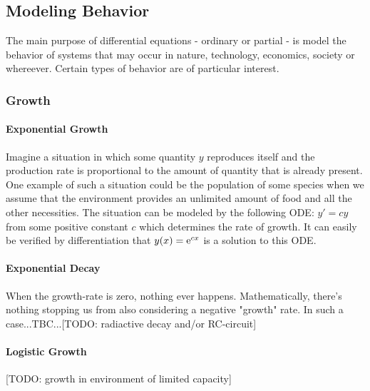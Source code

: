 \subsection{Modeling Behavior}
The main purpose of differential equations - ordinary or partial - is model the behavior of systems that may occur in nature, technology, economics, society or whereever. Certain types of behavior are of particular interest.

\subsubsection{Growth}

\paragraph{Exponential Growth} 
Imagine a situation in which some quantity $y$ reproduces itself and the production rate is proportional to the amount of quantity that is already present. One example of such a situation could be the population of some species when we assume that the environment provides an unlimited amount of food and all the other necessities. The situation can be modeled by the following ODE: $y' = c y$ from some positive constant $c$ which determines the rate of growth. It can easily be verified by differentiation that $y(x) = \operatorname{\mathrm{e}}^{c x}$ is a solution to this ODE.


\paragraph{Exponential Decay}
When the growth-rate is zero, nothing ever happens. Mathematically, there's nothing stopping us from also considering a negative "growth" rate. In such a case...TBC...[TODO: radiactive decay and/or RC-circuit]


\paragraph{Logistic Growth} [TODO: growth in environment of limited capacity]


